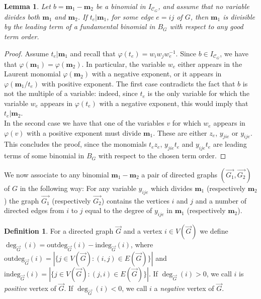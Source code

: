 \documentclass[11pt]{article}
\newtheorem{lemm}[theo]{Lemma}
\theoremstyle{definition}
\newtheorem{defi}[theo]{Definition}
\numberwithin{equation}{section}
\begin{document}
\begin{lemm}\label{lem: yij(e)}
    Let $b = \mathbf{m}_1 - \mathbf{m}_2$ be a binomial in $I_{\mathcal{C}_G}$, and assume that no variable divides both $\mathbf{m}_1$ and $\mathbf{m}_2$. If $t_{e}|\mathbf{m}_1$, for some edge $e=ij$ of $G$, then $\mathbf{m}_1$ is divisible by the leading term of a fundamental binomial in $B_G$ with respect to any good term order.
\end{lemm}
\begin{proof}
     Assume $t_{e}|\mathbf{m}_1$ and recall that $\varphi(t_{e})=w_iw_jw_e^{-1}$. Since $b\in I_{\mathcal{C}_G}$, we have that $\varphi(\mathbf{m}_1)=\varphi(\mathbf{m}_2)$. In particular, the variable $w_{e}$ either appears in the Laurent monomial $\varphi(\mathbf{m}_2)$ with a negative exponent, or it appears in $\varphi(\mathbf{m}_1/t_{e})$ with positive exponent. The first case contradicts the fact that $b$ is not the multiple of a variable: indeed, since $t_{e}$ is the only variable for which the variable $w_e$ appears in $\varphi(t_{e})$ with a negative exponent, this would imply that $t_{e}|\mathbf{m}_2$.\\
     In the second case we have that one of the variables $v$ for which $w_e$ appears in $\varphi(v)$ with a positive exponent must divide $\mathbf{m}_1$. These are either $z_e$, $y_{jie}$ or $y_{ije}$. 
     This concludes the proof, since the monomials $t_{e}z_e$, $y_{jie}t_{e}$ and $y_{ije}t_{e}$ are leading terms of some binomial in $B_G$ with respect to the chosen term order. 
\end{proof}

We now associate to any binomial $\mathbf{m}_1 - \mathbf{m}_2$ a pair of directed graphs $(\overrightarrow{G_1},\overrightarrow{G_2})$ of $G$ in the following way:
For any variable $y_{ije}$ which divides $\mathbf{m}_1$ (respectively $\mathbf{m}_2$) the graph $\overrightarrow{G_1}$ (respectively $\overrightarrow{G_2}$) contains the vertices $i$ and $j$ and a number of directed edges from $i$ to $j$ equal to the degree of $y_{ije}$ in $\mathbf{m}_1$ (respectively $\mathbf{m}_2$).
\begin{defi}
	For a directed graph $\overrightarrow{G}$ and a vertex $i\in V(\overrightarrow{G})$ we define $\deg_{\overrightarrow{G}}(i)=\text{outdeg}_{\overrightarrow{G}}(i)-\text{indeg}_{\overrightarrow{G}}(i)$, where $\text{outdeg}_{\overrightarrow{G}}(i) = |\{j\in V(\overrightarrow{G}) : (i,j)\in E(\overrightarrow{G})\}|$ and $\text{indeg}_{\overrightarrow{G}}(i) = |\{j\in V(\overrightarrow{G}) : (j,i)\in E(\overrightarrow{G})\}|$. If $\deg_{\overrightarrow{G}}(i)>0$, we call $i$ is  \emph{positive} vertex of  $\overrightarrow{G}$.  If $\deg_{\overrightarrow{G}}(i)<0$, we call $i$ a \emph{negative} vertex of  $\overrightarrow{G}$.
\end{defi}
\end{document}
